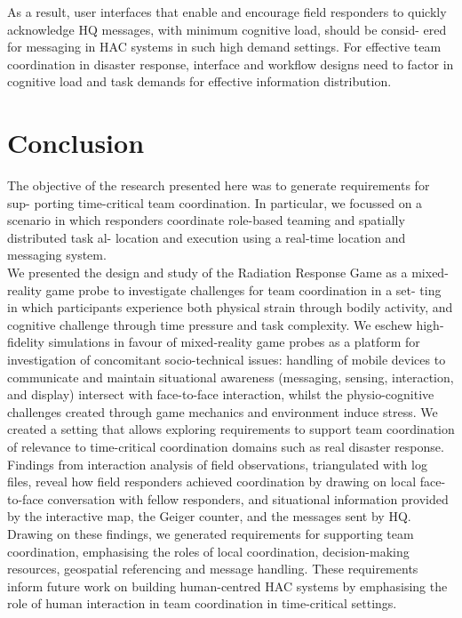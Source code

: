 As a result, user interfaces that enable and encourage field responders to quickly acknowledge HQ messages, with minimum cognitive load, should be consid- ered for messaging in HAC systems in such high demand settings. For effective team coordination in disaster response, interface and workflow designs need to factor in cognitive load and task demands for effective information distribution.\\

\section{Conclusion}
The objective of the research presented here was to generate requirements for sup- porting time-critical team coordination. In particular, we focussed on a scenario in which responders coordinate role-based teaming and spatially distributed task al- location and execution using a real-time location and messaging system.\\

We presented the design and study of the Radiation Response Game as a mixed-reality game probe to investigate challenges for team coordination in a set- ting in which participants experience both physical strain through bodily activity, and cognitive challenge through time pressure and task complexity. We eschew high-fidelity simulations in favour of mixed-reality game probes as a platform for investigation of concomitant socio-technical issues: handling of mobile devices to communicate and maintain situational awareness (messaging, sensing, interaction, and display) intersect with face-to-face interaction, whilst the physio-cognitive challenges created through game mechanics and environment induce stress. We created a setting that allows exploring requirements to support team coordination of relevance to time-critical coordination domains such as real disaster response.\\

Findings from interaction analysis of field observations, triangulated with log files, reveal how field responders achieved coordination by drawing on local face-to-face conversation with fellow responders, and situational information provided by the interactive map, the Geiger counter, and the messages sent by HQ. Drawing on these findings, we generated requirements for supporting team coordination, emphasising the roles of local coordination, decision-making resources, geospatial referencing and message handling. These requirements inform future work on building human-centred HAC systems by emphasising the role of human interaction in team coordination in time-critical settings.\\

